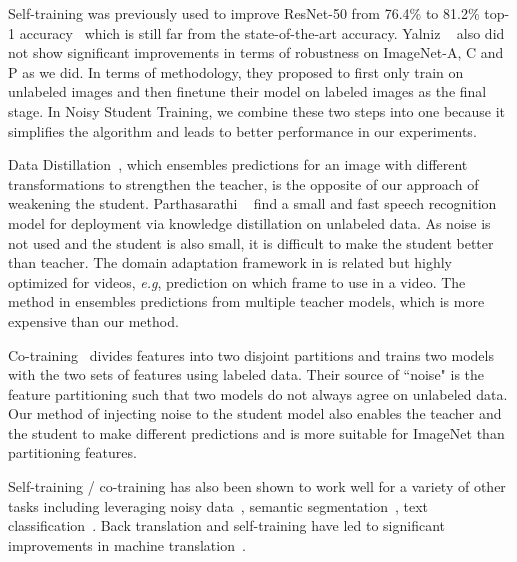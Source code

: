 \documentclass[10pt,twocolumn,letterpaper]{article}
\def\eg{\emph{e.g}\onedot}
\begin{document}
Self-training was previously used to improve ResNet-50 from 76.4\%  to 81.2\% top-1 accuracy~\cite{billion_large_scale} which is still far from the state-of-the-art accuracy. Yalniz \etal~\cite{billion_large_scale} also  did not show significant improvements in terms of robustness on ImageNet-A, C and P as we did.  In terms of methodology, they proposed to first only train on unlabeled images and then finetune their model on labeled images as the final stage. In Noisy Student Training, we combine these two steps into one because it simplifies the algorithm and leads to better performance in our experiments.


Data Distillation~\cite{radosavovic2018data}, which ensembles predictions for an image with different transformations to strengthen the teacher, is the opposite of our approach of weakening the student. Parthasarathi \etal~\cite{parthasarathi2019lessons} find a small and fast speech recognition model for deployment via knowledge distillation on unlabeled data. As noise is not used and the student is also small, it is difficult to  make the student better than teacher. 
The domain adaptation framework in \cite{Chowdhury19} is related but highly optimized for videos, \eg, prediction on which frame to use in a video. The method in \cite{zhou2018edf} ensembles predictions from multiple teacher models, which is more expensive than our method.

Co-training~\cite{blum1998combining} divides features into two disjoint partitions and trains two models with the two sets of features using labeled data. Their source of ``noise" is the feature partitioning such that two models do not always agree on unlabeled data. Our method of injecting noise to the student model also enables the teacher and the student to make different predictions and is more suitable for ImageNet than partitioning features. 

Self-training / co-training has also been shown to work well for a variety of other tasks including leveraging noisy data~\cite{veit2017learning}, semantic segmentation~\cite{babakhin2019semi}, text classification~\cite{karamanolakis2019leveraging,sun2019learning}. Back translation and self-training have led to significant improvements in machine translation~\cite{sennrich2015improving, edunov2018understanding, he2016dual,cheng2016semi,wu2019exploiting,he2019revisiting}.
\end{document}
